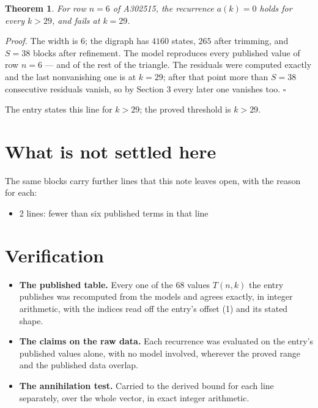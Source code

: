 \documentclass[11pt]{article}
\newtheorem{theorem}{Theorem}
\theoremstyle{definition}
\begin{document}
\begin{theorem} For row $n = 6$ of A302515, the recurrence $a(k) = 0$ holds for every $k > 29$, and fails at $k = 29$.\end{theorem}

{\itshape Proof.} The width is $6$; the digraph has $4160$ states, $265$ after trimming, and $S = 38$ blocks after refinement. The model reproduces every published value of row $n = 6$ --- and of the rest of the triangle. The residuals were computed exactly and the last nonvanishing one is at $k = 29$; after that point more than $S = 38$ consecutive residuals vanish, so by Section 3 every later one vanishes too. $\square$

The entry states this line for $k > 29$; the proved threshold is $k > 29$.

\section{What is not settled here}

The same blocks carry further lines that this note leaves open, with the reason for each:

\begin{itemize}

\item 2 lines: fewer than six published terms in that line

\end{itemize}

\section{Verification}

\begin{itemize}

\item {\bfseries The published table.} Every one of the 68 values $T(n,k)$ the entry publishes was recomputed from the models and agrees exactly, in integer arithmetic, with the indices read off the entry's offset (1) and its stated shape.

\item {\bfseries The claims on the raw data.} Each recurrence was evaluated on the entry's published values alone, with no model involved, wherever the proved range and the published data overlap.

\item {\bfseries The annihilation test.} Carried to the derived bound for each line separately, over the whole vector, in exact integer arithmetic.

\end{itemize}
\end{document}
